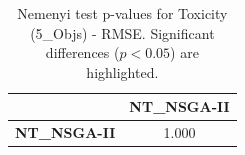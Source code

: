 \begin{table}[h!]
\centering
\scriptsize
\begin{tabular}{lc}
\toprule
 & NT\_NSGA-II \\
\midrule
\textbf{NT\_NSGA-II} & 1.000 \\
\bottomrule
\end{tabular}
\caption{Nemenyi test p-values for Toxicity (5_Objs) - RMSE. Significant differences ($p < 0.05$) are highlighted.}
\label{tab:nemenyi_nemenyi_Toxicity_5_Objs_Test_RMSE}
\end{table}